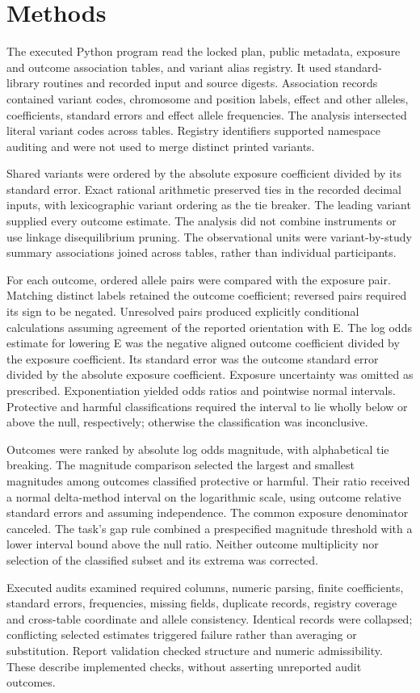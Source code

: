 \documentclass[10pt,a4paper]{article}
\begin{document}
\section*{Methods}
The executed Python program read the locked plan, public metadata, exposure and outcome association tables, and variant alias registry. It used standard-library routines and recorded input and source digests. Association records contained variant codes, chromosome and position labels, effect and other alleles, coefficients, standard errors and effect allele frequencies. The analysis intersected literal variant codes across tables. Registry identifiers supported namespace auditing and were not used to merge distinct printed variants.
\par
Shared variants were ordered by the absolute exposure coefficient divided by its standard error. Exact rational arithmetic preserved ties in the recorded decimal inputs, with lexicographic variant ordering as the tie breaker. The leading variant supplied every outcome estimate. The analysis did not combine instruments or use linkage disequilibrium pruning. The observational units were variant-by-study summary associations joined across tables, rather than individual participants.
\par
For each outcome, ordered allele pairs were compared with the exposure pair. Matching distinct labels retained the outcome coefficient; reversed pairs required its sign to be negated. Unresolved pairs produced explicitly conditional calculations assuming agreement of the reported orientation with E. The log odds estimate for lowering E was the negative aligned outcome coefficient divided by the exposure coefficient. Its standard error was the outcome standard error divided by the absolute exposure coefficient. Exposure uncertainty was omitted as prescribed. Exponentiation yielded odds ratios and pointwise normal intervals. Protective and harmful classifications required the interval to lie wholly below or above the null, respectively; otherwise the classification was inconclusive.
\par
Outcomes were ranked by absolute log odds magnitude, with alphabetical tie breaking. The magnitude comparison selected the largest and smallest magnitudes among outcomes classified protective or harmful. Their ratio received a normal delta-method interval on the logarithmic scale, using outcome relative standard errors and assuming independence. The common exposure denominator canceled. The task's gap rule combined a prespecified magnitude threshold with a lower interval bound above the null ratio. Neither outcome multiplicity nor selection of the classified subset and its extrema was corrected.
\par
Executed audits examined required columns, numeric parsing, finite coefficients, standard errors, frequencies, missing fields, duplicate records, registry coverage and cross-table coordinate and allele consistency. Identical records were collapsed; conflicting selected estimates triggered failure rather than averaging or substitution. Report validation checked structure and numeric admissibility. These describe implemented checks, without asserting unreported audit outcomes.
\par
\end{document}
